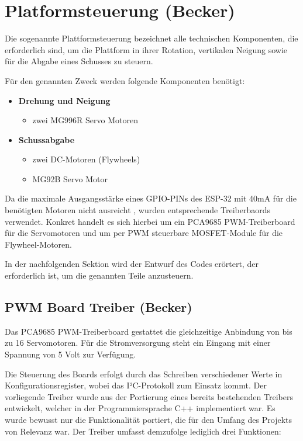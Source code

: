 \section{Platformsteuerung (Becker)}

Die sogenannte Plattformsteuerung bezeichnet alle technischen Komponenten, die erforderlich sind, um die Plattform in ihrer Rotation, vertikalen Neigung sowie für die Abgabe eines Schusses zu steuern.

Für den genannten Zweck werden folgende Komponenten benötigt:

\begin{itemize}
    \item \textbf{Drehung und Neigung}
    \begin{itemize}
        \item zwei MG996R Servo Motoren
    \end{itemize}
    \item \textbf{Schussabgabe}
    \begin{itemize}
        \item zwei DC-Motoren (Flywheels)
        \item MG92B Servo Motor
    \end{itemize}
\end{itemize}

Da die maximale Ausgangsstärke eines GPIO-PINs des ESP-32 mit 40mA \cite[S.~53]{esp_datasheet} für die benötigten Motoren nicht ausreicht \cite{esp_platform_flywheel_motor,esp_platform_small_servo,esp_platform_servo}, wurden entsprechende Treiberbaords verwendet.
Konkret handelt es sich hierbei um ein PCA9685 PWM-Treiberboard für die Servomotoren und um per PWM steuerbare MOSFET-Module für die Flywheel-Motoren.

In der nachfolgenden Sektion wird der Entwurf des Codes erörtert, der erforderlich ist, um die genannten Teile anzusteuern.

\subsection{PWM Board Treiber (Becker)}

Das PCA9685 PWM-Treiberboard gestattet die gleichzeitige Anbindung von bis zu 16 Servomotoren.
Für die Stromversorgung steht ein Eingang mit einer Spannung von 5 Volt zur Verfügung.

Die Steuerung des Boards erfolgt durch das Schreiben verschiedener Werte in Konfigurationsregister, wobei das I²C-Protokoll zum Einsatz kommt. 
Der vorliegende Treiber wurde aus der Portierung eines bereits bestehenden Treibers \cite{esp_pca9685_blueprint} entwickelt, welcher in der Programmiersprache C++ implementiert war. 
Es wurde bewusst nur die Funktionalität portiert, die für den Umfang des Projekts von Relevanz war. 
Der Treiber umfasst demzufolge lediglich drei Funktionen:

